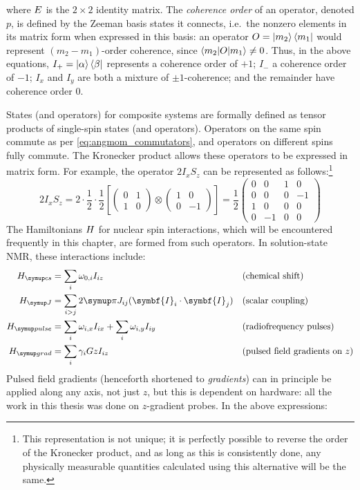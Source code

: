 where $E\/$ is the $2 \times 2$ identity matrix.
The \textit{coherence order} of an operator, denoted $p$, is defined by the Zeeman basis states it connects, i.e.\ the nonzero elements in its matrix form when expressed in this basis: an operator $O = \ket{m_2}\bra{m_1}$ would represent $(m_2 - m_1)$-order coherence, since $\braket{m_2|O|m_1} \neq 0$.
Thus, in the above equations, $I_+ = \ket{\alpha}\bra{\beta}$ represents a coherence order of $+1$; $I_-$ a coherence order of $-1$; $I_x$ and $I_y$ are both a mixture of $\pm 1$-coherence; and the remainder have coherence order $0$.

States (and operators) for composite systems are formally defined as tensor products of single-spin states (and operators)\autocite{Sakurai2021}.
Operators on the same spin commute as per \cref{eq:angmom_commutators}, and operators on different spins fully commute.
The Kronecker product allows these operators to be expressed in matrix form.\autocite{Hore2015}
For example, the operator $2I_xS_z$ can be represented as follows:\footnote{This representation is not unique; it is perfectly possible to reverse the order of the Kronecker product, and as long as this is consistently done, any physically measurable quantities calculated using this alternative will be the same.}
\begin{equation}
    \label{eq:composite_operator}
    2I_xS_z = 2 \cdot \frac{1}{2} \cdot \frac{1}{2} \left[ 
    \begin{pmatrix} 0 & 1 \\ 1 & 0 \end{pmatrix} \otimes
    \begin{pmatrix} 1 & 0 \\ 0 & -1 \end{pmatrix} \right]
    = \frac{1}{2} \begin{pmatrix} 0 & 0 & 1 & 0 \\ 0 & 0 & 0 & -1 \\ 1 & 0 & 0 & 0 \\ 0 & -1 & 0 & 0 \end{pmatrix}
\end{equation}
The Hamiltonians $H\/$ for nuclear spin interactions, which will be encountered frequently in this chapter, are formed from such operators.\autocite{Levitt2008}
In solution-state NMR, these interactions include:
\begin{align}
    \Hcs &= \sum_i \omega_{0,i} I_{iz} & &\text{(chemical shift)} \label{eq:h_cs} \\
    \HJ &= \sum_{i > j} 2\cpi J_{ij} (\symbf{I}_{i}\cdot \symbf{I}_{j}) & &\text{(scalar coupling)} \label{eq:h_j} \\
    \Hpulse &= \sum_i \omega_{i,x}I_{ix} + \sum_i \omega_{i,y}I_{iy} & &\text{(radiofrequency pulses)} \label{eq:h_pulse} \\
    \Hgrad &= \sum_i \gamma_i Gz I_{iz} & &\text{(pulsed field gradients on }z\text{)} \label{eq:h_grad}
\end{align}
Pulsed field gradients (henceforth shortened to \textit{gradients}) can in principle be applied along any axis, not just $z$, but this is dependent on hardware: all the work in this thesis was done on $z$-gradient probes.
In the above expressions:

